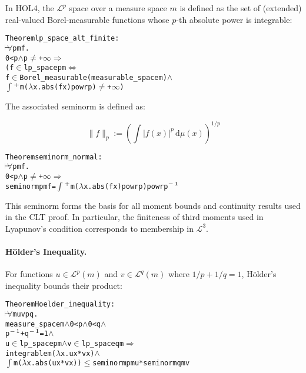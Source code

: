 In HOL4, the $\mathcal{L}^p$ space over a measure space $m$ is defined as the set of (extended) real-valued Borel-measurable functions whose $p$-th absolute power is integrable:
\begin{hol}
\begin{alltt}
Theorem lp\_space\_alt\_finite :
\(\!\!\!{\turn}\!\!\!\!\) \(\forall\)p m f.
0 < p \(\land\) p \(\ne\) +\(\infty\) \(\Rightarrow\)
(f \(\in\) lp\_space p m \({\Leftrightarrow}\)
 f \(\in\) Borel\_measurable (measurable\_space m) \(\land\)
 \(\int\)\(\sp{+}\) m (\(\lambda\)x. abs (f x) powr p) \(\ne\) +\(\infty\))
\end{alltt}
\end{hol}


The associated seminorm is defined as:

\[
\|f\|_p := \left( \int |f(x)|^p \, \mathrm{d}\mu(x) \right)^{1/p}
\]

\begin{hol}
\begin{alltt}
Theorem seminorm\_normal :
\(\!\!\!{\turn}\!\!\!\!\) \(\forall\)p m f.
0 < p \(\land\) p \(\ne\) +\(\infty\) \(\Rightarrow\)
seminorm p m f = \(\int\)\(\sp{+}\) m (\(\lambda\)x. abs (f x) powr p) powr p\(\sp{-}\)\(\sp{1}\)
\end{alltt}
\end{hol}

This seminorm forms the basis for all moment bounds and continuity results used in the CLT proof. In particular, the finiteness of third moments used in Lyapunov's condition corresponds to membership in $\mathcal{L}^3$.

\paragraph{Hölder’s Inequality.}
For functions $u \in \mathcal{L}^p(m)$ and $v \in \mathcal{L}^q(m)$ where $1/p + 1/q = 1$, Hölder’s inequality bounds their product:
\begin{hol}
\begin{alltt}
Theorem Hoelder\_inequality :
\(\!\!\!{\turn}\!\!\!\!\) \(\forall\)m u v p q.
measure\_space m \(\land\) 0 < p \(\land\) 0 < q \(\land\)
p\(\sp{-}\)\(\sp{1}\) + q\(\sp{-}\)\(\sp{1}\) = 1 \(\land\)
u \(\in\) lp\_space p m \(\land\) v \(\in\) lp\_space q m \(\Rightarrow\)
integrable m (\(\lambda\)x. u x * v x) \(\land\)
\(\int\) m (\(\lambda\)x. abs (u x * v x)) \(\le\) seminorm p m u * seminorm q m v
\end{alltt}
\end{hol}

